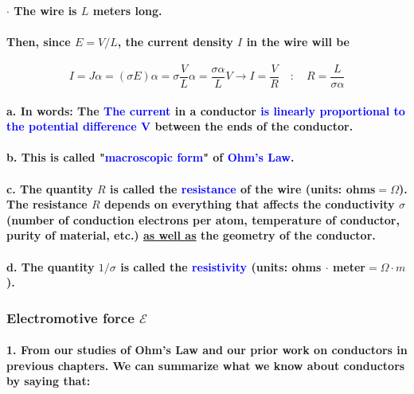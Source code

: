 \documentclass{article}
\begin{document}
\paragraph{\indent $\cdot$ The wire is $L$ meters long.}
\paragraph{Then, since $E=V/L$, the current density $I$ in the wire will be}
\begin{equation*}
    I=J\alpha=(\sigma E)\alpha=\sigma\frac{V}{L}\alpha=\frac{\sigma\alpha}{L}V\rightarrow I=\frac{V}{R}\quad:\quad R=\frac{L}{\sigma\alpha}
\end{equation*}
\paragraph{\indent a. In words: The \textcolor{blue}{The current} in a conductor \textcolor{blue}{is linearly proportional to the potential difference $\boldsymbol{V}$} between the ends of the conductor.}
\paragraph{\indent b. This is called "\textcolor{blue}{macroscopic form}" of \textcolor{blue}{Ohm's Law}.}
\paragraph{\indent c. The quantity $R$ is called the \textcolor{blue}{resistance} of the wire (units: ohms$=\Omega$). The resistance $R$ depends on everything that affects the conductivity $\sigma$ (number of conduction electrons per atom, temperature of conductor, purity of material, etc.) \underline{as well as} the geometry of the conductor.}
\paragraph{\indent d. The quantity $1/\sigma$ is called the \textcolor{blue}{resistivity} (units: ohms $\cdot$ meter$=\Omega\cdot m$).}
\subsubsection{Electromotive force $\mathcal{E}$}
\paragraph{1. From our studies of Ohm's Law and our prior work on conductors in previous chapters. We can summarize what we know about conductors by saying that:}
\end{document}
